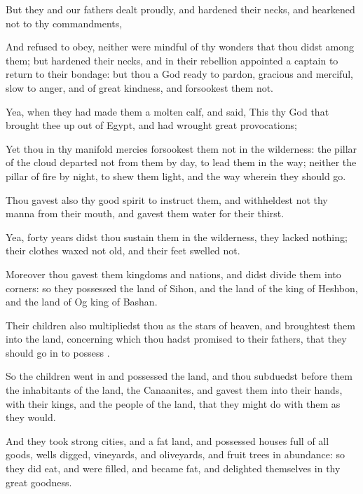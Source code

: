 {But they and our
fathers dealt
proudly, and
hardened their
necks, and
hearkened not to thy
commandments,

And
refused to
obey, neither were
mindful of thy
wonders that thou
didst among them; but
hardened their
necks, and in their
rebellion
appointed a
captain to
return to their
bondage: but thou
{} a
God ready to
pardon,
gracious and
merciful,
slow to
anger, and of
great
kindness, and
forsookest them not.

Yea, when they had
made them a
molten
calf, and
said, This
{} thy
God that brought thee
up out of
Egypt, and had
wrought
great
provocations;

Yet thou in thy
manifold
mercies
forsookest them not in the
wilderness: the
pillar of the
cloud
departed not from them by
day, to
lead them in the
way; neither the
pillar of
fire by
night, to shew them
light, and the
way wherein they should
go.

Thou
gavest also thy
good
spirit to
instruct them, and
withheldest not thy
manna from their
mouth, and
gavest them
water for their
thirst.

Yea,
forty
years didst thou
sustain them in the
wilderness,
{} they
lacked nothing; their
clothes waxed not
old, and their
feet
swelled not.

Moreover thou
gavest them
kingdoms and
nations, and didst
divide them into
corners: so they
possessed the
land of
Sihon, and the
land of the
king of
Heshbon, and the
land of
Og
king of
Bashan.

Their
children also
multipliedst thou as the
stars of
heaven, and
broughtest them into the
land, concerning which thou hadst
promised to their
fathers, that they should go
in to
possess
{}.

So the
children went
in and
possessed the
land, and thou
subduedst
before them the
inhabitants of the
land, the
Canaanites, and
gavest them into their
hands, with their
kings, and the
people of the
land, that they might
do with them as they
would.

And they
took
strong
cities, and a
fat
land, and
possessed
houses
full of all
goods,
wells
digged,
vineyards, and
oliveyards, and
fruit
trees in
abundance: so they did
eat, and were
filled, and became
fat, and
delighted themselves in thy
great
goodness.

}
